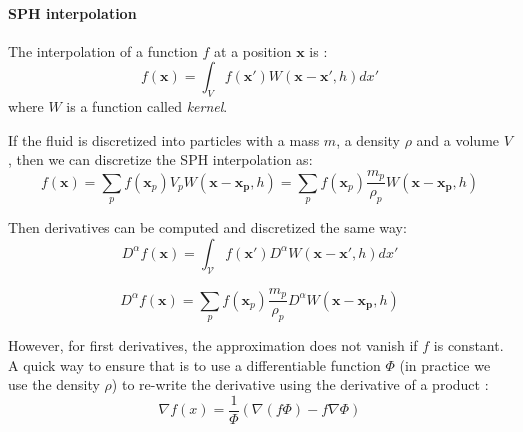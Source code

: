 \paragraph{SPH interpolation}
The interpolation of a function $f$ at a position $\mathbf{x}$ is :
\begin{equation}
f(\mathbf{x}) = \int_{V} f(\mathbf{x'})W(\mathbf{x}-\mathbf{x'}, h)dx'
\end{equation}
where $W$ is a function called \emph{kernel}. 

If the fluid is discretized into particles with a mass $m$, a density $\rho$ and a volume $V$, then we can discretize the SPH interpolation as:
\begin{equation}
f(\mathbf{x}) = \sum_{p} f(\mathbf{x}_{p})V_{p} W(\mathbf{x}-\mathbf{x_{p}},h) = \sum_{p} f(\mathbf{x}_{p})\frac{m_{p}}{\rho_{p}} W(\mathbf{x}-\mathbf{x_{p}},h)
\end{equation}

Then derivatives can be computed and discretized the same way:
\begin{equation}
D^{\alpha} f(\mathbf{x}) = \int_{\mathcal{V}} f(\mathbf{x'}) D^{\alpha} W(\mathbf{x}-\mathbf{x'}, h)dx'
\end{equation}

\begin{equation}
D^{\alpha} f(\mathbf{x})= \sum_{p} f(\mathbf{x}_{p})\frac{m_{p}}{\rho_{p}} D^{\alpha} W(\mathbf{x}-\mathbf{x_{p}},h)
\end{equation}

However, for first derivatives, the approximation does not vanish if $f$ is constant. A quick way to ensure that is to use a differentiable function $\Phi$ (in practice we use the density $\rho$) to re-write the derivative using the derivative of a product :
\begin{equation}
\nabla f(x) = \frac{1}{\Phi}\left(\nabla (f \Phi) - f \nabla \Phi \right)
\end{equation}

